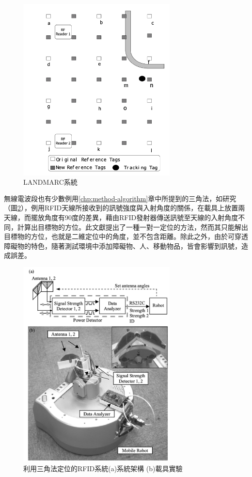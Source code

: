         \begin{figure}[htpb]
            \centering
            \includegraphics[width=8cm]{ch2pic/landmarc.png}
            \caption{LANDMARC系統\cite{landmarc}}
            \label{pic:landmarc}
        \end{figure}

        無線電波段也有少數例用\ref{chp:method-algorithm}章中所提到的三角法，如\cite{case:rfid_1to1}研究（圖\ref{pic:rfid_1to1}），例用RFID天線所接收到的訊號強度與入射角度的關係，在載具上放置兩天線，而擺放角度有90度的差異，藉由RFID發射器傳送訊號至天線的入射角度不同，計算出目標物的方位。此文獻提出了一種一對一定位的方法，然而其只能解出目標物的方位，也就是二維定位中的角度，並不包含距離。除此之外，由於可穿透障礙物的特色，隨著測試環境中添加障礙物、人、移動物品，皆會影響到訊號，造成誤差。

        \begin{figure}[htpb]
            \centering
            \includegraphics[width=8cm]{ch2pic/rfid_1to1.png}
           \caption{利用三角法定位的RFID系統\cite{case:rfid_1to1}(a)系統架構 (b)載具實驗}
            \label{pic:rfid_1to1}
        \end{figure}
        
